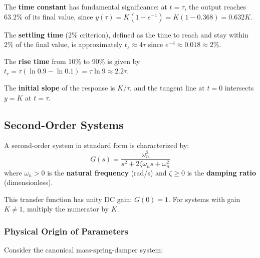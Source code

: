\begin{keyconceptbox}
The \textbf{time constant} has fundamental significance: at $t = \tau$, the output reaches $63.2\%$ of its final value, since $y(\tau) = K(1 - e^{-1}) = K(1 - 0.368) = 0.632K$.

The \textbf{settling time} (2\% criterion), defined as the time to reach and stay within 2\% of the final value, is approximately $t_s \approx 4\tau$ since $e^{-4} \approx 0.018 \approx 2\%$.

The \textbf{rise time} from 10\% to 90\% is given by $t_r = \tau(\ln 0.9 - \ln 0.1) = \tau \ln 9 \approx 2.2\tau$.

The \textbf{initial slope} of the response is $K/\tau$, and the tangent line at $t=0$ intersects $y=K$ at $t=\tau$.
\end{keyconceptbox}

\subsection{Second-Order Systems}

\begin{definition}
A second-order system in standard form is characterized by:
\begin{equation}
G(s) = \frac{\omega_n^2}{s^2 + 2\zeta\omega_n s + \omega_n^2}
\label{eq:second_order_tf}
\end{equation}
where $\omega_n > 0$ is the \textbf{natural frequency} (rad/s) and $\zeta \geq 0$ is the \textbf{damping ratio} (dimensionless).
\end{definition}

This transfer function has unity DC gain: $G(0) = 1$. For systems with gain $K \neq 1$, multiply the numerator by $K$.

\subsubsection{Physical Origin of Parameters}

Consider the canonical mass-spring-damper system:

